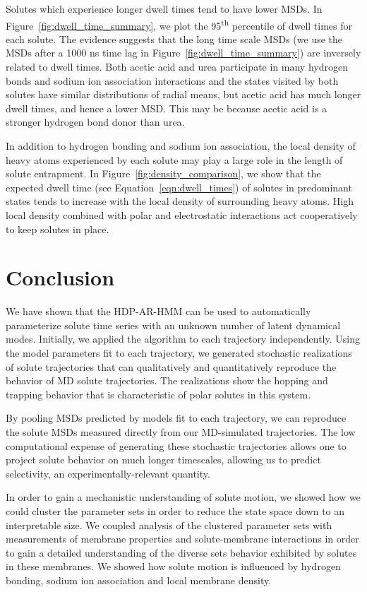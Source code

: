 \documentclass[journal=jpcbfk,manuscript=article]{achemso}
\begin{document}
  Solutes which experience longer dwell times tend to have lower MSDs. 
  In Figure~\ref{fig:dwell_time_summary}, we plot the 95\textsuperscript{th}
  percentile of dwell times for each solute. The evidence suggests that the 
  long time scale MSDs (we use the MSDs after a 1000 ns time lag in Figure~\ref{fig:dwell_time_summary})
  are inversely related to dwell times. Both acetic acid and urea participate 
  in many hydrogen bonds and sodium ion association interactions and the states
  visited by both solutes have similar distributions of radial means, but
  acetic acid has much longer dwell times, and hence a lower MSD. 
  This may be because acetic acid is a stronger hydrogen bond donor than urea.
  
  In addition to hydrogen bonding and sodium ion association, the local density 
  of heavy atoms experienced by each solute may play a large role in the length
  of solute entrapment. In Figure~\ref{fig:density_comparison}, we show that the
  expected dwell time (see Equation~\ref{eqn:dwell_times}) of solutes in 
  predominant states tends to increase with the local density of surrounding 
  heavy atoms. High local density combined with polar and electrostatic 
  interactions act cooperatively to keep solutes in place.
  
  \section{Conclusion}
  
  We have shown that the HDP-AR-HMM can be used to automatically parameterize solute 
  time series with an unknown number of latent dynamical modes. Initially, we applied
  the algorithm to each trajectory independently. Using the model parameters fit
  to each trajectory, we generated stochastic realizations of solute trajectories that
  can qualitatively and quantitatively reproduce the behavior of MD solute 
  trajectories. The realizations show the hopping and trapping behavior that is
  characteristic of polar solutes in this system. 
  
  By pooling MSDs predicted by models fit to each trajectory, we can reproduce
  the solute MSDs measured directly from our MD-simulated trajectories. 
  The low computational expense of generating these stochastic trajectories allows
  one to project solute behavior on much longer timescales, allowing us to predict
  selectivity, an experimentally-relevant quantity.
  
  In order to gain a mechanistic understanding of solute motion, we showed how 
  we could cluster the parameter sets in order to reduce the state space down
  to an interpretable size. We coupled analysis of the clustered parameter sets
  with measurements of membrane properties and solute-membrane interactions 
  in order to gain a detailed understanding of the diverse sets behavior 
  exhibited by solutes in these membranes. We showed how
  solute motion is influenced by hydrogen bonding, sodium ion association and local
  membrane density.
  
\end{document}
